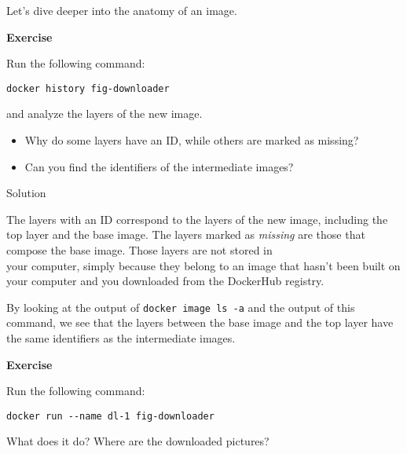 \documentclass[
]{article}
\providecommand{\tightlist}{%
  \setlength{\itemsep}{0pt}\setlength{\parskip}{0pt}}
\newenvironment{infobox}[1]
  {
  \begin{itemize}
  \renewcommand{\labelitemi}{
    \raisebox{-.7\height}[0pt][0pt]{
      
    }
  }
  \setlength{\fboxsep}{1em}
  \begin{whitebox}
  \item
  }
  {
  \end{whitebox}
  \end{itemize}
  }
\theoremstyle{definition}
\theoremstyle{definition}
\theoremstyle{definition}
\theoremstyle{remark}
\let\BeginKnitrBlock\begin \let\EndKnitrBlock\end
\begin{document}
Let's dive deeper into the anatomy of an image.

\begin{infobox}{exercisebox}

\textbf{Exercise}

\BeginKnitrBlock{exercise}
\protect\hypertarget{exr:unnamed-chunk-17}{}{\label{exr:unnamed-chunk-17} }Run the following command:

\texttt{docker\ history\ fig-downloader}

and analyze the layers of the new image.

\begin{itemize}
\tightlist
\item
  Why do some layers have an ID, while others
  are marked as missing?
\end{itemize}

\begin{itemize}
\tightlist
\item
  Can you find the identifiers of the intermediate images?
\end{itemize}
\EndKnitrBlock{exercise}

\end{infobox}

Solution

\begin{infobox}{exercisebox}

The layers with an ID correspond to the layers of
the new image, including the top layer and the base image.
The layers marked as \emph{missing} are those that compose the
base image. Those layers are not stored in\\
your computer,
simply because they belong to an image
that hasn't been built on your computer
and you downloaded from the DockerHub registry.

By looking at the output of \texttt{docker\ image\ ls\ -a} and the output of this command,
we see that the layers between the base image and the top layer have the
same identifiers as the intermediate images.

\end{infobox}

\begin{infobox}{exercisebox}

\textbf{Exercise}

\BeginKnitrBlock{exercise}
\protect\hypertarget{exr:dl-1-container}{}{\label{exr:dl-1-container} }Run the following command:

\texttt{docker\ run\ -\/-name\ dl-1\ fig-downloader}

What does it do? Where are the downloaded pictures?
\EndKnitrBlock{exercise}

\end{infobox}
\end{document}
